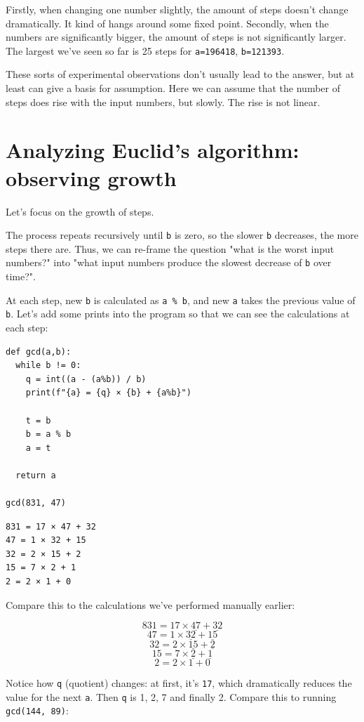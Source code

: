 \documentclass[a4paper, justified, notitlepage, sfsidenotes, notoc]{tufte-book}
\begin{document}
Firstly, when changing one number slightly, the amount of steps doesn't change dramatically. It kind of hangs around some fixed point. Secondly, when the numbers are significantly bigger, the amount of steps is not significantly larger. The largest we've seen so far is 25 steps for \texttt{a=196418}, \texttt{b=121393}.

These sorts of experimental observations don't usually lead to the answer, but at least can give a basis for assumption. Here we can assume that the number of steps does rise with the input numbers, but slowly. The rise is not linear.
\chapter{Analyzing Euclid's algorithm: observing growth}
\label{sec:orgc6b38f4}

Let's focus on the growth of steps.

The process repeats recursively until \texttt{b} is zero, so the slower \texttt{b} decreases, the more steps there are. Thus, we can re-frame the question "what is the worst input numbers?" into "what input numbers produce the slowest decrease of \texttt{b} over time?".

At each step, new \texttt{b} is calculated as \texttt{a \% b}, and new \texttt{a} takes the previous value of \texttt{b}. Let's add some prints into the program so that we can see the calculations at each step:

\begin{verbatim}
def gcd(a,b):
  while b != 0:
    q = int((a - (a%b)) / b)
    print(f"{a} = {q} × {b} + {a%b}")

    t = b
    b = a % b
    a = t

  return a

gcd(831, 47)
\end{verbatim}

\begin{verbatim}
831 = 17 × 47 + 32
47 = 1 × 32 + 15
32 = 2 × 15 + 2
15 = 7 × 2 + 1
2 = 2 × 1 + 0
\end{verbatim}

Compare this to the calculations we've performed manually earlier:

$$831 = 17 \times \underline{47} + \underline{32}$$
$$47 = 1 \times \underline{32} + \underline{15}$$
$$32 = 2 \times \underline{15} + \underline{2}$$
$$15 = 7 \times \underline{2} + \underline{1}$$
$$2 = 2 \times 1 + 0$$

Notice how \texttt{q} (quotient) changes: at first, it's \texttt{17}, which dramatically reduces the value for the next \texttt{a}. Then \texttt{q} is 1, 2, 7 and finally 2. Compare this to running \texttt{gcd(144, 89)}:
\end{document}
